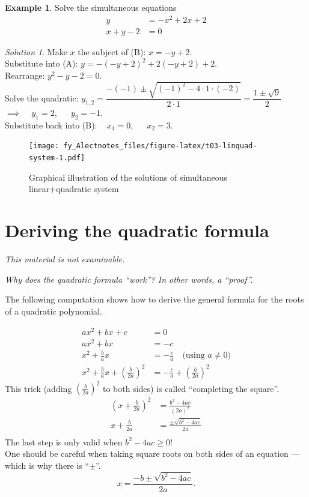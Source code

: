 \documentclass[
  12pt,
  oneside]{book}
\theoremstyle{definition}
\theoremstyle{definition}
\newtheorem{example}{Example}[chapter]
\theoremstyle{definition}
\theoremstyle{definition}
\theoremstyle{remark}
\newtheorem*{solution}{Solution}
\begin{document}
\begin{example}
Solve the simultaneous equations
\begin{align*}
y &= -x^2+2x+2 \tag{A}\\
x+y-2 &=0 \tag{B}
\end{align*}
\end{example}

\begin{solution}
Make \(x\) the subject of (B): \(x=-y+2\).\\
Substitute into (A): \(y=-(-y+2)^2+2(-y+2)+2\).\\
Rearrange: \(y^2-y-2=0\).\\
Solve the quadratic: \(y_{1,2}=\dfrac{-(-1)\pm\sqrt{(-1)^2-4\cdot1\cdot(-2)}}{2\cdot1} = \dfrac{1\pm\sqrt{9}}{2}\)\\
\(\implies\) ~ \(y_1=2\), ~~ \(y_2=-1\).\\
Substitute back into (B): ~ \(x_1=0\), ~~ \(x_2=3\).
\end{solution}

\begin{figure}
\centering
\texttt{[image: fy\_Alectnotes\_files/figure-latex/t03-linquad-system-1.pdf]}
\caption{\label{fig:t03-linquad-system}Graphical illustration of the solutions of simultaneous linear+quadratic system}
\end{figure}

\section{Deriving the quadratic formula}\label{deriving-the-quadratic-formula}

\emph{This material is not examinable.}

\emph{Why does the quadratic formula ``work''? In other words, a ``proof''.}

The following computation shows how to derive the general formula for the roots of a quadratic polynomial.

\begin{align*}
ax^2+bx+c &= 0\\
ax^2 + bx &= -c\\
x^2 + \tfrac{b}{a}x &= -\tfrac{c}{a} \quad\text{(using $a\not=0$)}\\
x^2 + \tfrac{b}{a}x + \left(\tfrac{b}{2a}\right)^2 &= -\tfrac{c}{a} + \left(\tfrac{b}{2a}\right)^2
\end{align*}
This trick (adding \(\left(\tfrac{b}{2a}\right)^2\) to both sides) is called ``completing the square''.
\begin{align*}
\left(x+\tfrac{b}{2a}\right)^2 &= \tfrac{b^2-4ac}{(2a)^2}\\
x+\tfrac{b}{2a} &= \frac{\pm\sqrt{b^2-4ac}}{2a}\\ %
\end{align*}
The last step is only valid when \(b^2-4ac\geq 0\)!\\
One should be careful when taking square roots on both sides of an equation --- which is why there is ``\(\pm\)''.
\[
x = \frac{-b\pm\sqrt{b^2-4ac}}{2a}.
\]
\end{document}
